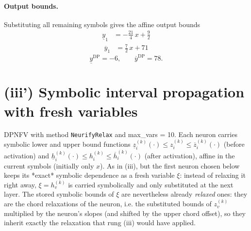\documentclass[11pt]{article}
\begin{document}
\paragraph{Output bounds.}
Substituting all remaining symbols gives the affine output bounds
\begin{align*}
\underline{y}_{1} &= -\frac{21}{4}\,x + \frac{9}{2}
\end{align*}
\begin{align*}
\overline{y}_{1} &= \frac{7}{2}\,x + 71
\end{align*}
\begin{equation*}
\underline{y}^{\text{DP}} = -6, \qquad \overline{y}^{\text{DP}} = 78.
\end{equation*}

\section{(iii') Symbolic interval propagation with fresh variables}
DPNFV with method \texttt{NeurifyRelax} and max\_vars = 10. Each neuron carries symbolic lower and upper bound functions
$\underline{z}^{(k)}_i(\cdot) \le z^{(k)}_i \le \overline{z}^{(k)}_i(\cdot)$ (before activation)
and $\underline{h}^{(k)}_i(\cdot) \le h^{(k)}_i \le \overline{h}^{(k)}_i(\cdot)$ (after activation),
affine in the current symbols (initially only $x$).
As in (iii), but the first neuron chosen below keeps its *exact*
symbolic dependence as a fresh variable $\xi$: instead of relaxing it right away, $\xi = h^{(k)}_v$
is carried symbolically and only substituted at the next layer. The stored symbolic bounds of $\xi$
are nevertheless already \emph{relaxed} ones: they are the chord relaxations of the neuron, i.e.
the substituted bounds of $z^{(k)}_v$ multiplied by the neuron's slopes (and shifted by the upper
chord offset), so they inherit exactly the relaxation that rung (iii) would have applied.
\end{document}
